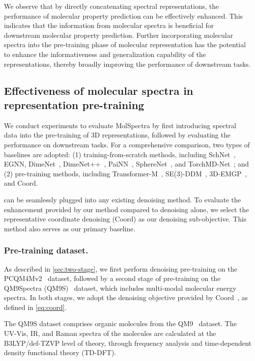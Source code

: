We observe that by directly concatenating spectral representations, the performance of molecular property prediction can be effectively enhanced. This indicates that the information from molecular spectra is beneficial for downstream molecular property prediction. Further incorporating molecular spectra into the pre-training phase of molecular representation has the potential to enhance the informativeness and generalization capability of the representations, thereby broadly improving the performance of downstream tasks.

\subsection{Effectiveness of molecular spectra in representation pre-training}

We conduct experiments to evaluate MolSpectra by first introducing spectral data into the pre-training of 3D representations, followed by evaluating the performance on downstream tasks.
For a comprehensive comparison, two types of baselines are adopted: (1) training-from-scratch methods, including SchNet~\citep{SchNet}, EGNN, DimeNet~\citep{DimeNet}, DimeNet++~\citep{DimeNet++}, PaiNN~\citep{PaiNN}, SphereNet~\citep{SphereNet}, and TorchMD-Net~\citep{TorchMD-Net}; and (2) pre-training methods, including Transformer-M~\citep{Transformer-M}, SE(3)-DDM~\citep{SE3-DDM}, 3D-EMGP~\citep{3D-EMGP}, and Coord. 

\themodel can be seamlessly plugged into any existing denoising method. To evaluate the enhancement provided by our method compared to denoising alone, we select the representative coordinate denoising (Coord) as our denoising sub-objective. This method also serves as our primary baseline.

\subsubsection{Pre-training dataset.}
As described in \cref{sec:two-stage}, we first perform denoising pre-training on the PCQM4Mv2~\citep{PCQM} dataset, followed by a second stage of pre-training on the QM9Spectra (QM9S)~\citep{DetaNet} dataset, which includes multi-modal molecular energy spectra.  {In both stages, we adopt the denoising objective provided by Coord~\citep{Coord}, as defined in \cref{eq:coord}.}

The QM9S dataset comprises organic molecules from the QM9~\citep{QM9} dataset.
The UV-Vis, IR, and Raman spectra of the molecules are calculated at the B3LYP/def-TZVP level of theory, through frequency analysis and time-dependent density functional theory (TD-DFT).


